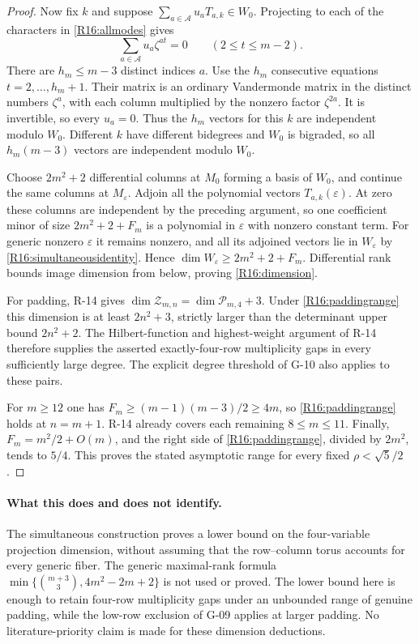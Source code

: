 \documentclass[11pt,a4paper]{article}
\theoremstyle{definition}\newtheorem{definition}{Definition}
\begin{document}
\begin{proof}
Now fix $k$ and suppose
$\sum_{a\in\mathcal A}u_aT_{a,k}\in W_0$.
Projecting to each of the characters in
\eqref{R16:allmodes} gives
\[
 \sum_{a\in\mathcal A}u_a\zeta^{at}=0
 \qquad(2\leq t\leq m-2).
\]
There are $h_m\leq m-3$ distinct indices $a$.
Use the $h_m$ consecutive equations
$t=2,\ldots,h_m+1$. Their matrix is an ordinary
Vandermonde matrix in the distinct numbers $\zeta^a$,
with each column multiplied by the nonzero factor
$\zeta^{2a}$. It is invertible, so every $u_a=0$.
Thus the $h_m$ vectors for this $k$ are independent
modulo $W_0$. Different $k$ have different bidegrees
and $W_0$ is bigraded, so all $h_m(m-3)$ vectors are
independent modulo $W_0$.

Choose $2m^2+2$ differential columns at $M_0$ forming a
basis of $W_0$, and continue the same columns at
$M_\varepsilon$. Adjoin all the polynomial vectors
$T_{a,k}(\varepsilon)$. At zero these columns are
independent by the preceding argument, so one coefficient
minor of size $2m^2+2+F_m$ is a polynomial in
$\varepsilon$ with nonzero constant term. For generic
nonzero $\varepsilon$ it remains nonzero, and all its
adjoined vectors lie in $W_\varepsilon$ by
\eqref{R16:simultaneousidentity}. Hence
$\dim W_\varepsilon\geq2m^2+2+F_m$.
Differential rank bounds image dimension from below,
proving \eqref{R16:dimension}.

For padding, R-14 gives
$\dim\mathcal Z_{m,n}=\dim\mathcal P_{m,4}+3$.
Under \eqref{R16:paddingrange} this dimension is at least
$2n^2+3$, strictly larger than the determinant upper
bound $2n^2+2$. The Hilbert-function and highest-weight
argument of R-14 therefore supplies the asserted
exactly-four-row multiplicity gaps in every sufficiently
large degree. The explicit degree threshold of G-10
also applies to these pairs.

For $m\geq12$ one has
$F_m\geq(m-1)(m-3)/2\geq4m$, so
\eqref{R16:paddingrange} holds at $n=m+1$.
R-14 already covers each remaining $8\leq m\leq11$.
Finally, $F_m=m^2/2+O(m)$, and the right side of
\eqref{R16:paddingrange}, divided by $2m^2$, tends to
$5/4$. This proves the stated asymptotic range for every
fixed $\rho<\sqrt5/2$.
\end{proof}

\paragraph{What this does and does not identify.}
The simultaneous construction proves a lower bound on the
four-variable projection dimension, without assuming that
the row--column torus accounts for every generic fiber.
The generic maximal-rank formula
$\min\{\binom{m+3}{3},4m^2-2m+2\}$ is not used or proved.
The lower bound here is enough to retain four-row
multiplicity gaps under an unbounded range of genuine
padding, while the low-row exclusion of G-09 applies at
larger padding. No literature-priority claim is made for
these dimension deductions.
\end{document}
